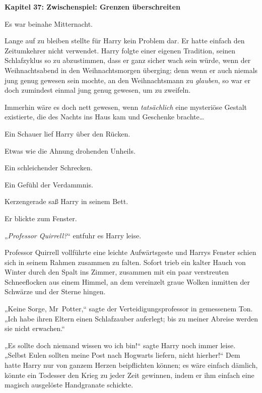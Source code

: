 

\hypertarget{zwischenspiel-grenzen-uxfcberschreiten}{%

\textbf{Kapitel 37: Zwischenspiel: Grenzen überschreiten}

Es war beinahe Mitternacht.

Lange auf zu bleiben stellte für Harry kein Problem dar. Er hatte einfach den Zeitumkehrer nicht verwendet. Harry folgte einer eigenen Tradition, seinen Schlafzyklus so zu abzustimmen, dass er ganz sicher wach sein würde, wenn der Weihnachtsabend in den Weihnachtsmorgen überging; denn wenn er auch niemals jung genug gewesen sein mochte, an den Weihnachtsmann zu \emph{glauben}, so war er doch zumindest einmal jung genug gewesen, um zu zweifeln.

Immerhin wäre es doch nett gewesen, wenn \emph{tatsächlich} eine mysteriöse Gestalt existierte, die des Nachts ins Haus kam und Geschenke brachte…

Ein Schauer lief Harry über den Rücken.

Etwas wie die Ahnung drohenden Unheils.

Ein schleichender Schrecken.

Ein Gefühl der Verdammnis.

Kerzengerade saß Harry in seinem Bett.

Er blickte zum Fenster.

„\emph{Professor Quirrell?}“ entfuhr es Harry leise.

Professor Quirrell vollführte eine leichte Aufwärtsgeste und Harrys Fenster schien sich in seinem Rahmen zusammen zu falten. Sofort trieb ein kalter Hauch von Winter durch den Spalt ins Zimmer, zusammen mit ein paar verstreuten Schneeflocken aus einem Himmel, an dem vereinzelt graue Wolken inmitten der Schwärze und der Sterne hingen.

„Keine Sorge, Mr~Potter,“ sagte der Verteidigungsprofessor in gemessenem Ton. „Ich habe ihren Eltern einen Schlafzauber auferlegt; bis zu meiner Abreise werden sie nicht erwachen.“

„Es sollte doch niemand wissen wo ich bin!“ sagte Harry noch immer leise. „Selbst Eulen sollten meine Post nach Hogwarts liefern, nicht hierher!“ Dem hatte Harry nur von ganzem Herzen beipflichten können; es wäre einfach dämlich, könnte ein Todesser den Krieg zu jeder Zeit gewinnen, indem er ihm einfach eine magisch ausgelöste Handgranate schickte.

}
